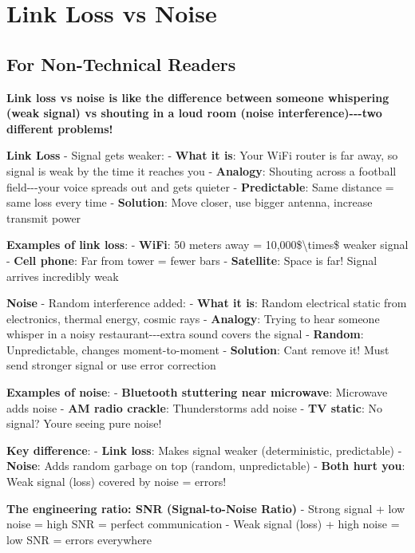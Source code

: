 \section{Link Loss vs Noise}\label{link-loss-vs-noise}

\subsection{\texorpdfstring{ For Non-Technical
Readers}{ For Non-Technical Readers}}\label{for-non-technical-readers}

\textbf{Link loss vs noise is like the difference between someone
whispering (weak signal) vs shouting in a loud room (noise
interference)-\/-\/-two different problems!}

\textbf{Link Loss} - Signal gets weaker: - \textbf{What it is}: Your
WiFi router is far away, so signal is weak by the time it reaches you -
\textbf{Analogy}: Shouting across a football field-\/-\/-your voice
spreads out and gets quieter - \textbf{Predictable}: Same distance =
same loss every time - \textbf{Solution}: Move closer, use bigger
antenna, increase transmit power

\textbf{Examples of link loss}: - \textbf{WiFi}: 50 meters away =
10,000\$\textbackslash times\$ weaker signal - \textbf{Cell phone}: Far
from tower = fewer bars - \textbf{Satellite}: Space is far! Signal
arrives incredibly weak

\textbf{Noise} - Random interference added: - \textbf{What it is}:
Random electrical static from electronics, thermal energy, cosmic rays -
\textbf{Analogy}: Trying to hear someone whisper in a noisy
restaurant-\/-\/-extra sound covers the signal - \textbf{Random}:
Unpredictable, changes moment-to-moment - \textbf{Solution}:
Can\textquotesingle t remove it! Must send stronger signal or use error
correction

\textbf{Examples of noise}: - \textbf{Bluetooth stuttering near
microwave}: Microwave adds noise - \textbf{AM radio crackle}:
Thunderstorms add noise - \textbf{TV static}: No signal?
You\textquotesingle re seeing pure noise!

\textbf{Key difference}: - \textbf{Link loss}: Makes signal weaker
(deterministic, predictable) - \textbf{Noise}: Adds random garbage on
top (random, unpredictable) - \textbf{Both hurt you}: Weak signal (loss)
covered by noise = errors!

\textbf{The engineering ratio: SNR (Signal-to-Noise Ratio)} - Strong
signal + low noise = high SNR = perfect communication - Weak signal
(loss) + high noise = low SNR = errors everywhere

